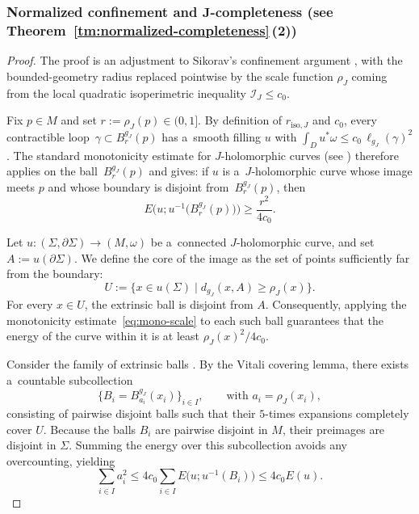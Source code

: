 \documentclass[10pt,a4paper]{amsart}
\numberwithin{equation}{section}
\theoremstyle{definition}
\begin{document}
\subsubsection[Normalized confinement and J-completeness (Theorem 1.16 (2))]{Normalized confinement and $\boldsymbol{J}$-completeness (see Theorem~\ref{tm:normalized-completeness}\,(2))}
\begin{proof}

 The proof is an adjustment to Sikorav's confinement argument \cite[Proposition~4.4.1]{Sikorav}, with the bounded-geometry radius replaced pointwise by the scale function $\rho_J$ coming from the local quadratic isoperimetric inequality $\mathcal{I}_J\le c_0$.

 Fix $p\in M$ and set $r:=\rho_J(p)\in(0,1]$.
 By definition of $r_{\mathrm{iso},J}$ and $c_0$, every contractible loop~${\gamma\subset B^{g_J}_{r}(p)}$ has a~smooth filling $u$ with $\int_D u^*\omega\le c_0\,\ell_{g_J}(\gamma)^2$.
 The standard monotonicity estimate for $J$-holomorphic curves (see \cite[Proposition 4.3.1]{Sikorav}) therefore applies on the ball~$B^{g_J}_{r}(p)$ and gives: if $u$ is a~$J$-holomorphic curve whose image meets $p$ and whose boundary is disjoint from~$B^{g_J}_{r}(p)$, then
 \begin{equation}\label{eq:mono-scale}
 E\bigl(u; u^{-1}\bigl(B^{g_J}_{r}(p)\bigr)\bigr) \ge \frac{r^2}{4c_0}.
 \end{equation}

 Let $u\colon(\Sigma,\partial\Sigma)\to(M,\omega)$ be a~connected $J$-holomorphic curve, and set $A:=u(\partial\Sigma)$.
 We define the core of the image as the set of points sufficiently far from the boundary:
 \[ U := \{ x \in u(\Sigma) \mid d_{g_J}(x, A) \ge \rho_J(x) \}. \]
 For every $x \in U$, the extrinsic ball  is disjoint from $A$. Consequently, applying the monotonicity estimate~\eqref{eq:mono-scale} to each such ball guarantees that the energy of the curve within it is at least $\rho_J(x)^2 / 4c_0$.

 Consider the family of extrinsic balls . By the Vitali covering lemma, there exists a~countable subcollection
 \[
 \big\{ B_i = B^{g_J}_{a_i}(x_i) \big\}_{i \in I} , \qquad \text{with $a_i = \rho_J(x_i)$},
 \]
consisting of pairwise disjoint balls such that their $5$-times expansions  completely cover $U$.
 Because the balls $B_i$ are pairwise disjoint in $M$, their preimages are disjoint in $\Sigma$. Summing the energy over this subcollection avoids any overcounting, yielding
 \[%
 \sum_{i \in I} a_i^2 \le 4c_0 \sum_{i \in I} E\bigl(u; u^{-1}(B_i)\bigr) \le 4c_0 E(u).
 \]


\end{proof}
\end{document}
